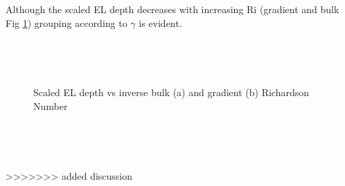 
Although the scaled \acs{EL} depth decreases with increasing \acs{Ri} (gradient and bulk Fig \ref{fig:scaledeltahinvri})
grouping according to $\gamma$ is evident.\\

\begin{figure}[htbp]
\begin{minipage}[b]{0.5\linewidth}
        \\
        \end{minipage}             
\quad
\begin{minipage}[b]{0.5\linewidth}
        \\
       
       \end{minipage}
        \caption{Scaled EL depth vs inverse bulk (a)  and gradient (b) Richardson Number}
        \label{fig:scaledeltahinvri}
\end{figure}



\begin{figure}[htbp]
\begin{minipage}[b]{0.5\linewidth}
        \\
        \end{minipage}             
\quad
\begin{minipage}[b]{0.5\linewidth}
        \\
       
       \end{minipage}
        \caption{}
        \label{fig:}
\end{figure}


>>>>>>> added discussion

\endinput

Any text after an \endinput is ignored.
You could put scraps here or things in progress.
